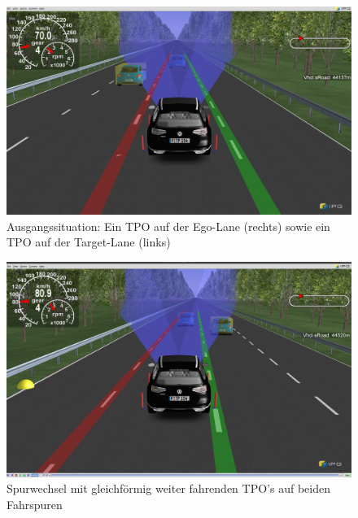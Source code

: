 \begin{figure}[!ht]
	\begin{center}
		\includegraphics[width=1.0\linewidth]{Abbildungen/bericht/carmaker_lc_part1}
		\caption{Ausgangssituation: Ein TPO auf der Ego-Lane (rechts) sowie ein TPO auf der Target-Lane (links) }
		\label{fig.carmaker_lanechange_part1}
	\end{center}
\end{figure} 

\begin{figure}[!ht]
	\begin{center}
		\includegraphics[width=1.0\linewidth]{Abbildungen/bericht/carmaker_lc_part2}
		\caption{Spurwechsel mit gleichförmig weiter fahrenden TPO's auf beiden Fahrspuren}
		\label{fig.carmaker_lanechange_part2}
	\end{center}
\end{figure} 

